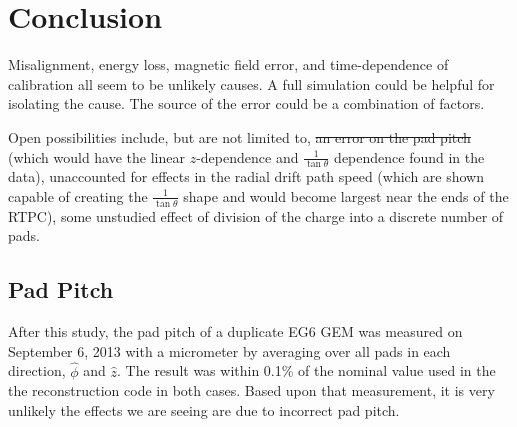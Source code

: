 \documentclass[amsmath,amssymb,notitlepage,11pt]{revtex4-1}
\begin{document}
\section{Conclusion}
Misalignment, energy loss, magnetic field error, and time-dependence of calibration all seem to be unlikely causes.  A full simulation could be helpful for isolating the cause.
The source of the error could be a combination of factors.

Open possibilities include, but are not limited to, \sout{an error on the pad pitch} (which would have the linear $z$-dependence and $\frac{1}{\tan\theta}$ dependence found in the data), unaccounted for effects in the radial drift path speed (which are shown capable of creating the $\frac{1}{\tan\theta}$ shape and would become largest near the ends of the RTPC), some unstudied effect of division of the charge into a discrete number of pads.
\subsection{Pad Pitch}
After this study, the pad pitch of a duplicate EG6 GEM was measured on September 6, 2013 with a micrometer by averaging over all pads in each direction, $\hat{\phi}$ and $\hat{z}$.   The result was within 0.1\% of the nominal value used in the the reconstruction code in both cases.  Based upon that measurement, it is very unlikely the effects we are seeing are due to incorrect pad pitch.

\appendix
\end{document}
